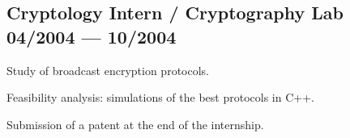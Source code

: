 \subsection{{Cryptology Intern / Cryptography Lab  \hfill 04/2004  --- 10/2004}}
\begin{zitemize}
\item Study of broadcast encryption protocols.
\item Feasibility analysis: simulations of the best protocols in C++.
\item Submission of a patent at the end of the internship.
\end{zitemize}


